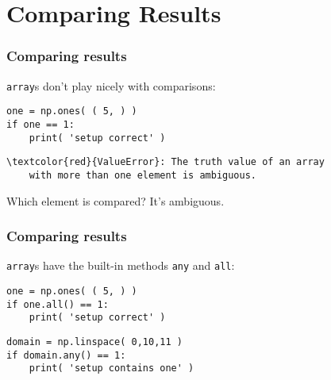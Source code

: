 \documentclass[11pt]{beamer}
\begin{document}
\section{Comparing Results}

\begin{frame}[fragile]
  \frametitle{Comparing results}
  \Enlarge

  \begin{enumerate}
  \myitem  \texttt{array}s don't play nicely with comparisons:
  \begin{Verbatim}
one = np.ones( ( 5, ) )
if one == 1:
    print( 'setup correct' )
  \end{Verbatim}
  \pause
  \begin{Verbatim}[commandchars=\\\{\},commentchar=\%]
\textcolor{red}{ValueError}: The truth value of an array
    with more than one element is ambiguous.
  \end{Verbatim}
  \pause
  \myitem  Which element is compared?  It's ambiguous.
  \end{enumerate}
\end{frame}

\begin{frame}[fragile]
  \frametitle{Comparing results}
  \Enlarge

  \begin{enumerate}
  \myitem  \texttt{array}s have the built-in methods \texttt{any} and \texttt{all}:
  \begin{Verbatim}
one = np.ones( ( 5, ) )
if one.all() == 1:
    print( 'setup correct' )
  \end{Verbatim}
  \pause
  \begin{Verbatim}[commandchars=\\\{\},commentchar=\%]
domain = np.linspace( 0,10,11 )
if domain.any() == 1:
    print( 'setup contains one' )
  \end{Verbatim}
  \end{enumerate}
\end{frame}
\end{document}
